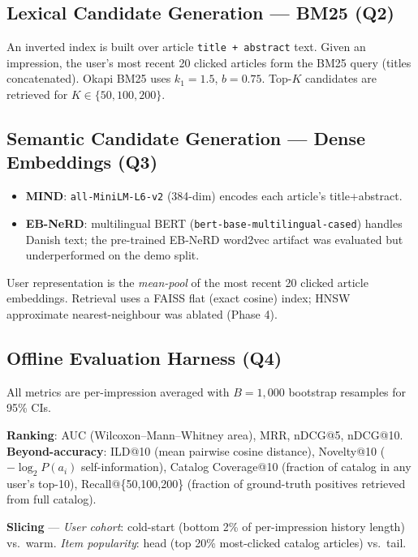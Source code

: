 \documentclass[11pt,a4paper]{article}
\begin{document}
\subsection{Lexical Candidate Generation --- BM25 (Q2)}

An inverted index is built over article \texttt{title + abstract} text.  Given an impression, the user's most recent 20 clicked articles form the BM25 query (titles concatenated).  Okapi BM25 uses $k_1{=}1.5$, $b{=}0.75$.  Top-$K$ candidates are retrieved for $K \in \{50, 100, 200\}$.

\subsection{Semantic Candidate Generation --- Dense Embeddings (Q3)}

\begin{itemize}
  \item \textbf{MIND}: \texttt{all-MiniLM-L6-v2} (384-dim) encodes each article's title+abstract.
  \item \textbf{EB-NeRD}: multilingual BERT (\texttt{bert-base-multilingual-cased}) handles Danish text; the pre-trained EB-NeRD word2vec artifact was evaluated but underperformed on the demo split.
\end{itemize}

User representation is the \emph{mean-pool} of the most recent 20 clicked article embeddings.  Retrieval uses a FAISS flat (exact cosine) index; HNSW approximate nearest-neighbour was ablated (Phase 4).

\subsection{Offline Evaluation Harness (Q4)}

All metrics are per-impression averaged with $B{=}1{,}000$ bootstrap resamples for 95\% CIs.

\textbf{Ranking}: AUC (Wilcoxon--Mann--Whitney area), MRR, nDCG@5, nDCG@10. \textbf{Beyond-accuracy}: ILD@10 (mean pairwise cosine distance), Novelty@10 ($-\!\log_2 P(a_i)$ self-information), Catalog Coverage@10 (fraction of catalog in any user's top-10), Recall@\{50,100,200\} (fraction of ground-truth positives retrieved from full catalog).

\textbf{Slicing} --- \emph{User cohort}: cold-start (bottom 2\% of per-impression history length) vs.\ warm. \emph{Item popularity}: head (top 20\% most-clicked catalog articles) vs.\ tail.
\end{document}
